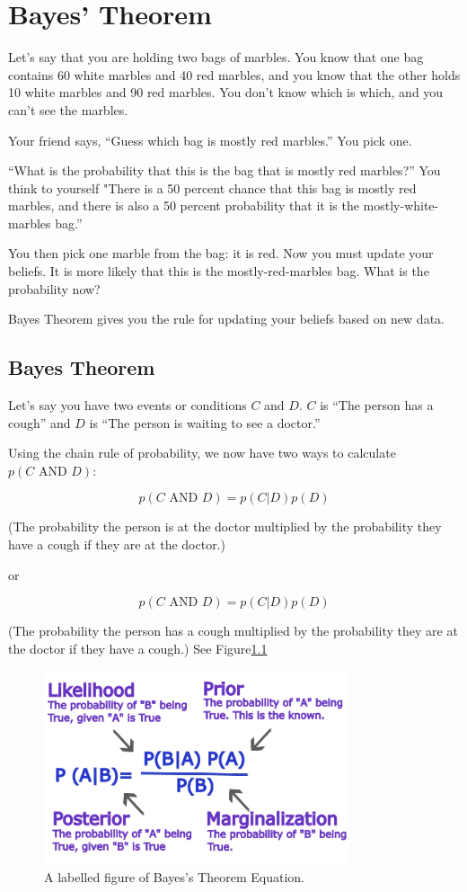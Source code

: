\chapter{Bayes' Theorem}
Let's say that you are holding two bags of marbles.
You know that one bag contains 60 white marbles and 40 red marbles, and you
know that the other holds 10 white marbles and 90 red marbles. You
don't know which is which, and you can't see the marbles.

Your friend says, ``Guess which bag is mostly red marbles.'' You pick one.

``What is the probability that this is the bag that is mostly red marbles?''
 You think to yourself "There is a 50 percent chance that this bag is mostly red marbles, and there is
also a 50 percent probability that it is the mostly-white-marbles bag.''

You then pick one marble from the bag: it is red. Now you must
update your beliefs. It is more likely that this is the
mostly-red-marbles bag. What is the probability now?

Bayes Theorem gives you the rule for updating your beliefs based on
new data.

\section{Bayes Theorem}

Let's say you have two events or conditions $C$ and $D$. $C$ is
``The person has a cough'' and $D$ is ``The person is waiting to see a doctor.''

Using the chain rule of probability, we now have two ways to calculate $p(C \text{ AND } D)$:

$$p(C \text{ AND } D) = p(C | D) p(D)$$

(The probability the person is at the doctor multiplied by the probability they have a cough if they are at the doctor.)

or 

$$p(C \text{ AND } D) = p(C | D) p(D)$$

(The probability the person has a cough multiplied by the probability they are at the doctor if they have a cough.) See Figure\ref{fig:bayes1}
\begin{figure}[htbp]
    \centering
    \includegraphics[width=0.8\textwidth]{Probability.png}
    \caption{A labelled figure of Bayes's Theorem Equation.}
    \label{fig:bayes1}
\end{figure}

